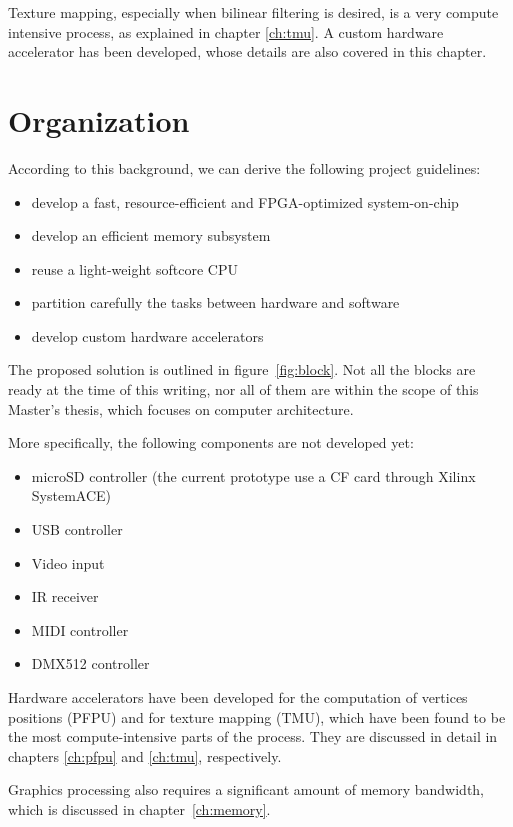 \documentclass[a4paper,11pt]{kthesis}
\begin{document}
Texture mapping, especially when bilinear filtering is desired, is a very compute intensive process, as explained in chapter \ref{ch:tmu}. A custom hardware accelerator has been developed, whose details are also covered in this chapter.

\section{Organization}
According to this background, we can derive the following project guidelines:

\begin{itemize}
\item develop a fast, resource-efficient and FPGA-optimized system-on-chip
\item develop an efficient memory subsystem
\item reuse a light-weight softcore CPU
\item partition carefully the tasks between hardware and software
\item develop custom hardware accelerators
\end{itemize}

The proposed solution is outlined in figure~\ref{fig:block}. Not all the blocks are ready at the time of this writing, nor all of them are within the scope of this Master's thesis, which focuses on computer architecture.

More specifically, the following components are not developed yet:
\begin{itemize}
\item microSD controller (the current prototype use a CF card through Xilinx SystemACE)
\item USB controller
\item Video input
\item IR receiver
\item MIDI controller
\item DMX512 controller
\end{itemize}

Hardware accelerators have been developed for the computation of vertices positions (PFPU) and for texture mapping (TMU), which have been found to be the most compute-intensive parts of the process. They are discussed in detail in chapters \ref{ch:pfpu} and \ref{ch:tmu}, respectively.

Graphics processing also requires a significant amount of memory bandwidth, which is discussed in chapter~\ref{ch:memory}.
\end{document}
